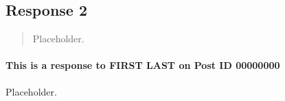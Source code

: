 
\subsection{Response 2}
  \begin{quotation}
    Placeholder.
  \end{quotation}

  \paragraph{This is a response to FIRST LAST on Post ID 00000000}
    Placeholder.
